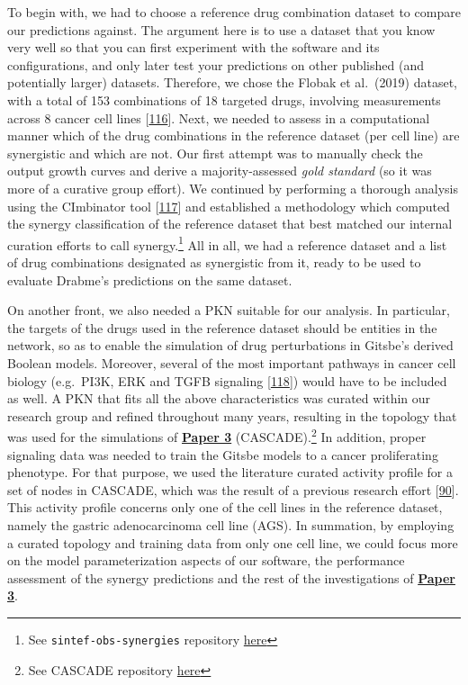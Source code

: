 \documentclass[
  12pt,
]{book}
\begin{document}
\newpage

To begin with, we had to choose a reference drug combination dataset to compare our predictions against.
The argument here is to use a dataset that you know very well so that you can first experiment with the software and its configurations, and only later test your predictions on other published (and potentially larger) datasets.
Therefore, we chose the Flobak et al.~(2019) dataset, with a total of 153 combinations of 18 targeted drugs, involving measurements across 8 cancer cell lines {[}\protect\hyperlink{ref-Flobak2019}{116}{]}.
Next, we needed to assess in a computational manner which of the drug combinations in the reference dataset (per cell line) are synergistic and which are not.
Our first attempt was to manually check the output growth curves and derive a majority-assessed \emph{gold standard} (so it was more of a curative group effort).
We continued by performing a thorough analysis using the CImbinator tool {[}\protect\hyperlink{ref-Flobak2017}{117}{]} and established a methodology which computed the synergy classification of the reference dataset that best matched our internal curation efforts to call synergy.\footnote{See \texttt{sintef-obs-synergies} repository \protect\hyperlink{misc-links}{here}}
All in all, we had a reference dataset and a list of drug combinations designated as synergistic from it, ready to be used to evaluate Drabme's predictions on the same dataset.

On another front, we also needed a PKN suitable for our analysis.
In particular, the targets of the drugs used in the reference dataset should be entities in the network, so as to enable the simulation of drug perturbations in Gitsbe's derived Boolean models.
Moreover, several of the most important pathways in cancer cell biology (e.g.~PI3K, ERK and TGFB signaling {[}\protect\hyperlink{ref-kegg-cancer}{118}{]}) would have to be included as well.
A PKN that fits all the above characteristics was curated within our research group and refined throughout many years, resulting in the topology that was used for the simulations of \textbf{\protect\hyperlink{Paper3}{Paper 3}} (CASCADE).\footnote{See CASCADE repository \protect\hyperlink{misc-links}{here}}
In addition, proper signaling data was needed to train the Gitsbe models to a cancer proliferating phenotype.
For that purpose, we used the literature curated activity profile for a set of nodes in CASCADE, which was the result of a previous research effort {[}\protect\hyperlink{ref-Flobak2015}{90}{]}.
This activity profile concerns only one of the cell lines in the reference dataset, namely the gastric adenocarcinoma cell line (AGS).
In summation, by employing a curated topology and training data from only one cell line, we could focus more on the model parameterization aspects of our software, the performance assessment of the synergy predictions and the rest of the investigations of \textbf{\protect\hyperlink{Paper3}{Paper 3}}.
\end{document}
